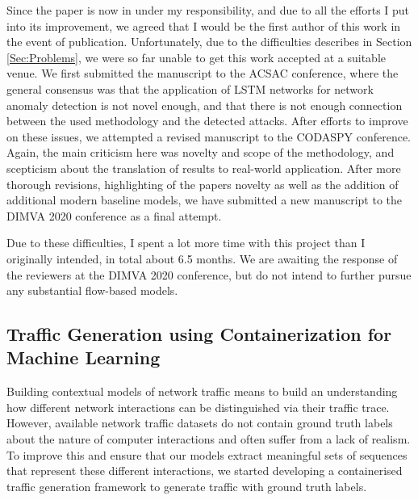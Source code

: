 \documentclass[a4paper,12pt,twoside]{article}
\begin{document}
Since the paper is now in under my responsibility, and due to all the efforts I put into its improvement, we agreed that I would be the first author of this work in the event of publication. Unfortunately, due to the difficulties describes in Section \ref{Sec:Problems}, we were so far unable to get this work accepted at a suitable venue. We first submitted the manuscript to the ACSAC conference, where the general consensus was that the application of LSTM networks for network anomaly detection is not novel enough, and that there is not enough connection between the used methodology and the detected attacks.
After efforts to improve on these issues, we attempted a revised manuscript to the CODASPY conference. Again, the main criticism here was novelty and scope of the methodology, and scepticism about the translation of results to real-world application. After more thorough revisions, highlighting of the papers novelty as well as the addition of additional modern baseline models, we have submitted a new manuscript to the DIMVA 2020 conference as a final attempt. 

Due to these difficulties, I spent a lot more time with this project than I originally intended, in total about 6.5 months. We are awaiting the response of the reviewers at the DIMVA 2020 conference, but do not intend to further pursue any substantial flow-based models.



\subsection{Traffic Generation using Containerization for Machine Learning}

Building contextual models of network traffic means to build an understanding how different network interactions can be distinguished via their traffic trace. However, available network traffic datasets do not contain ground truth labels about the nature of computer interactions and often suffer from a lack of realism. To improve this and ensure that our models extract meaningful sets of sequences that represent these different interactions, we started developing a containerised traffic generation framework to generate traffic with ground truth labels. 

\end{document}
